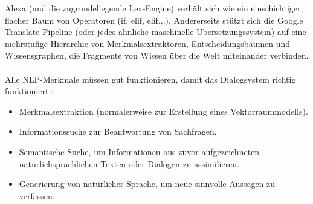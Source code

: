 Alexa (und die zugrundeliegende Lex-Engine) verhält sich wie ein einschichtiger, flacher Baum von Operatoren (if, elif, elif...). 
Andererseits stützt sich die Google Translate-Pipeline (oder jedes ähnliche maschinelle Übersetzungssystem) auf eine mehrstufige Hierarchie von Merkmalsextraktoren, Entscheidungsbäumen und Wissensgraphen, die Fragmente von Wissen über die Welt miteinander verbinden. \cite{janarthanam_hands-chatbots_2017}\\\\
Alle \ac{NLP}-Merkmale müssen gut funktionieren, damit das Dialogsystem richtig funktioniert \cite{lane_natural_2019}:
\begin{itemize}
    \item Merkmalsextraktion (normalerweise zur Erstellung eines Vektorraummodells).
    \item Informationssuche zur Beantwortung von Sachfragen.
    \item Semantische Suche, um Informationen aus zuvor aufgezeichneten natürlichsprachlichen Texten oder Dialogen zu assimilieren.
    \item Generierung von natürlicher Sprache, um neue sinnvolle Aussagen zu verfassen.
\end{itemize}
